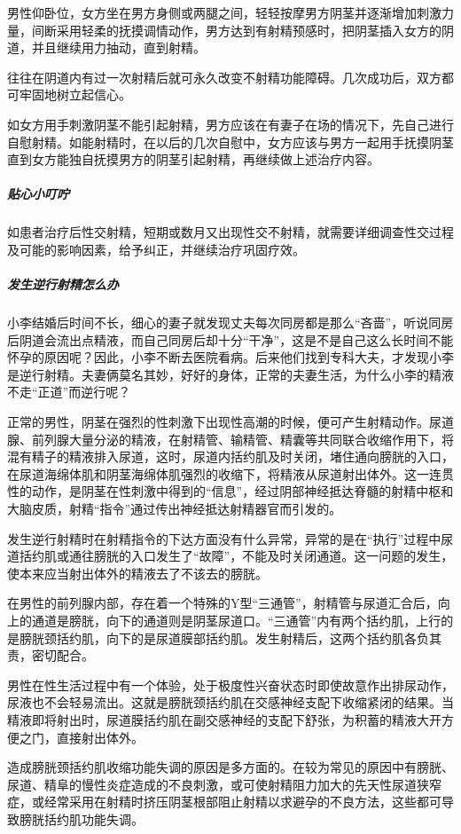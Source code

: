 男性仰卧位，女方坐在男方身侧或两腿之间，轻轻按摩男方阴茎并逐渐增加刺激力量，间断采用轻柔的抚摸调情动作，男方达到有射精预感时，把阴茎插入女方的阴道，并且继续用力抽动，直到射精。

往往在阴道内有过一次射精后就可永久改变不射精功能障碍。几次成功后，双方都可牢固地树立起信心。

如女方用手刺激阴茎不能引起射精，男方应该在有妻子在场的情况下，先自己进行自慰射精。如能射精时，在以后的几次自慰中，女方应该与男方一起用手抚摸阴茎直到女方能独自抚摸男方的阴茎引起射精，再继续做上述治疗内容。

\subparagraph{贴心小叮咛}

如患者治疗后性交射精，短期或数月又出现性交不射精，就需要详细调查性交过程及可能的影响因素，给予纠正，并继续治疗巩固疗效。

\subparagraph{发生逆行射精怎么办}

小李结婚后时间不长，细心的妻子就发现丈夫每次同房都是那么“吝啬”，听说同房后阴道会流出点精液，而自己同房后却十分“干净”，这是不是自己这么长时间不能怀孕的原因呢？因此，小李不断去医院看病。后来他们找到专科大夫，才发现小李是逆行射精。夫妻俩莫名其妙，好好的身体，正常的夫妻生活，为什么小李的精液不走“正道”而逆行呢？

正常的男性，阴茎在强烈的性刺激下出现性高潮的时候，便可产生射精动作。尿道腺、前列腺大量分泌的精液，在射精管、输精管、精囊等共同联合收缩作用下，将混有精子的精液排入尿道，这时，尿道内括约肌及时关闭，堵住通向膀胱的入口，在尿道海绵体肌和阴茎海绵体肌强烈的收缩下，将精液从尿道射出体外。这一连贯性的动作，是阴茎在性刺激中得到的“信息”，经过阴部神经抵达脊髓的射精中枢和大脑皮质，射精“指令”通过传出神经抵达射精器官而引发的。

发生逆行射精时在射精指令的下达方面没有什么异常，异常的是在“执行”过程中尿道括约肌或通往膀胱的入口发生了“故障”，不能及时关闭通道。这一问题的发生，使本来应当射出体外的精液去了不该去的膀胱。

在男性的前列腺内部，存在着一个特殊的Y型“三通管”，射精管与尿道汇合后，向上的通道是膀胱，向下的通道则是阴茎尿道口。“三通管”内有两个括约肌，上行的是膀胱颈括约肌，向下的是尿道膜部括约肌。发生射精后，这两个括约肌各负其责，密切配合。

男性在性生活过程中有一个体验，处于极度性兴奋状态时即使故意作出排尿动作，尿液也不会轻易流出。这就是膀胱颈括约肌在交感神经支配下收缩紧闭的结果。当精液即将射出时，尿道膜括约肌在副交感神经的支配下舒张，为积蓄的精液大开方便之门，直接射出体外。

造成膀胱颈括约肌收缩功能失调的原因是多方面的。在较为常见的原因中有膀胱、尿道、精阜的慢性炎症造成的不良刺激，或可使射精阻力加大的先天性尿道狭窄症，或经常采用在射精时挤压阴茎根部阻止射精以求避孕的不良方法，这些都可导致膀胱括约肌功能失调。

